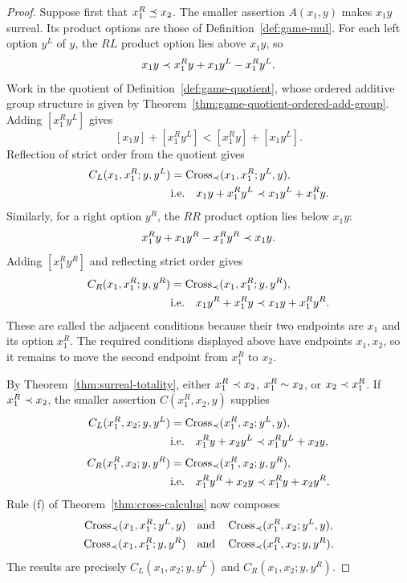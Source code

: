 \begin{proof}
  Suppose first that \(x_1^R\preceq x_2\).  The smaller assertion
  \(A(x_1,y)\) makes \(x_1y\) surreal.  Its product options are those of
  Definition~\ref{def:game-mul}.  For each left option \(y^L\) of \(y\), the
  \(RL\) product option lies above \(x_1y\), so
  \[
    x_1y\prec x_1^Ry+x_1y^L-x_1^Ry^L.
  \]
  Work in the quotient of Definition~\ref{def:game-quotient}, whose ordered additive group
  structure is given by Theorem~\ref{thm:game-quotient-ordered-add-group}.  Adding
  \([x_1^Ry^L]\) gives
  \[
    [x_1y]+[x_1^Ry^L]<[x_1^Ry]+[x_1y^L].
  \]
  Reflection of strict order from the quotient gives
  \[
    \begin{aligned}
      C_L(x_1,x_1^R;y,y^L)
        &=\operatorname{Cross}_{\prec}(x_1,x_1^R;y^L,y),\\
        &\text{i.e.}\quad
          x_1y+x_1^Ry^L\prec x_1y^L+x_1^Ry.
    \end{aligned}
  \]
  Similarly, for a right option \(y^R\),
  the \(RR\) product option lies below \(x_1y\):
  \[
    x_1^Ry+x_1y^R-x_1^Ry^R\prec x_1y.
  \]
  Adding \([x_1^Ry^R]\) and reflecting strict order gives
  \[
    \begin{aligned}
      C_R(x_1,x_1^R;y,y^R)
        &=\operatorname{Cross}_{\prec}(x_1,x_1^R;y,y^R),\\
        &\text{i.e.}\quad
          x_1y^R+x_1^Ry\prec x_1y+x_1^Ry^R.
    \end{aligned}
  \]
  These are called the adjacent conditions because their two endpoints are
  \(x_1\) and its option \(x_1^R\).  The required conditions displayed above
  have endpoints \(x_1,x_2\), so it remains to move the second endpoint from
  \(x_1^R\) to \(x_2\).

  By Theorem~\ref{thm:surreal-totality}, either
  \(x_1^R\prec x_2\), \(x_1^R\sim x_2\), or
  \(x_2\prec x_1^R\).  If \(x_1^R\prec x_2\), the smaller assertion
  \(C(x_1^R,x_2,y)\) supplies
  \[
    \begin{aligned}
      C_L(x_1^R,x_2;y,y^L)
        &=\operatorname{Cross}_{\prec}(x_1^R,x_2;y^L,y),\\
        &\text{i.e.}\quad
          x_1^Ry+x_2y^L\prec x_1^Ry^L+x_2y,\\[1mm]
      C_R(x_1^R,x_2;y,y^R)
        &=\operatorname{Cross}_{\prec}(x_1^R,x_2;y,y^R),\\
        &\text{i.e.}\quad
          x_1^Ry^R+x_2y\prec x_1^Ry+x_2y^R.
    \end{aligned}
  \]
  Rule \textup{(f)} of Theorem~\ref{thm:cross-calculus} now composes
  \[
    \begin{gathered}
      \operatorname{Cross}_{\prec}(x_1,x_1^R;y^L,y)
      \quad\text{and}\quad
      \operatorname{Cross}_{\prec}(x_1^R,x_2;y^L,y),\\
      \operatorname{Cross}_{\prec}(x_1,x_1^R;y,y^R)
      \quad\text{and}\quad
      \operatorname{Cross}_{\prec}(x_1^R,x_2;y,y^R).
    \end{gathered}
  \]
  The results are precisely
  \(C_L(x_1,x_2;y,y^L)\) and \(C_R(x_1,x_2;y,y^R)\).


\end{proof}
